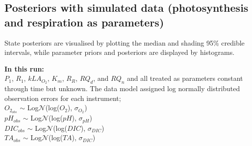 \documentclass{ruthesis}
\begin{document}

%
%


\FloatBarrier
\subsection{Posteriors with simulated data (photosynthesis and respiration as parameters)}\label{sec:micro_sim_results1}

State posteriors are visualised by plotting the median and shading 95\% credible intervals, while parameter priors and posteriors are displayed by histograms.

\textbf{In this run:}\\
$P_1$, $R_1$, $kLA_{O_2}$, $K_m$, $R_R$, $RQ_d$, and $RQ_n$ and all treated as parameters constant through time but unknown. The data model assigned log normally distributed observation errors for each instrument;\\
$O_{2_{obs}}$ $\sim$ Log$\mathcal{N}$(log($O_2$), $\sigma_{O_2}$)\\
$pH_{obs}$ $\sim$ Log$\mathcal{N}$(log($pH$),  $\sigma_{pH}$)\\
$DIC_{obs}$ $\sim$ Log$\mathcal{N}$(log($DIC$), $\sigma_{DIC}$)\\
$TA_{obs}$ $\sim$ Log$\mathcal{N}$(log($TA$), $\sigma_{DIC}$)\\
\end{document}
